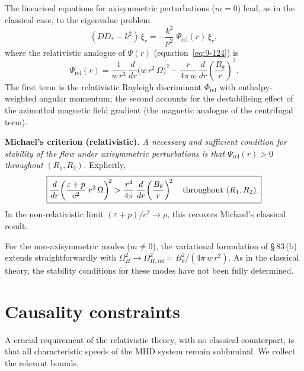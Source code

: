 The linearised equations for axisymmetric perturbations ($m=0$) lead,
as in the classical case, to the eigenvalue problem
\begin{equation}
  (DD_{*} - k^{2})\,\xi_{r}
  = -\frac{k^{2}}{p^{2}}\;
    \Psi_{\mathrm{rel}}(r)\,\xi_{r},
  \label{eq:rel-9-126}
\end{equation}
where the relativistic analogue of $\Psi(r)$
(equation~\eqref{eq:9-124}) is
\begin{equation}
  \Psi_{\mathrm{rel}}(r)
  = \frac{1}{w\,r^{3}}\,\frac{d}{dr}\bigl(w\,r^{2}\,\Omega\bigr)^{2}
    - \frac{r}{4\pi\,w}\,\frac{d}{dr}\!\left(\frac{B_{\theta}}{r}\right)^{\!2}.
  \label{eq:rel-9-Psi}
\end{equation}
The first term is the relativistic Rayleigh discriminant
$\Phi_{\mathrm{rel}}$ with enthalpy-weighted angular momentum; the
second accounts for the destabilising effect of the azimuthal magnetic
field gradient (the magnetic analogue of the centrifugal term).

\medskip\noindent\textbf{Michael's criterion (relativistic).}
\emph{A necessary and sufficient condition for stability of the flow
under axisymmetric perturbations is that
$\Psi_{\mathrm{rel}}(r) > 0$ throughout $(R_{1},R_{2})$.}  Explicitly,
\begin{equation}
  \boxed{%
  \frac{d}{dr}\!\left(\frac{\varepsilon+p}{c^{2}}\;
    r^{2}\,\Omega\right)^{\!2}
  > \frac{r^{4}}{4\pi}\,
    \frac{d}{dr}\!\left(\frac{B_{\theta}}{r}\right)^{\!2}
  \quad\text{throughout } (R_{1},R_{2}).}
  \label{eq:rel-9-Michael}
\end{equation}
In the non-relativistic limit $(\varepsilon+p)/c^{2}\to\rho$, this
recovers Michael's classical result.

For the non-axisymmetric modes ($m\ne 0$), the variational
formulation of \S\,83\,(b) extends straightforwardly with
$\Omega_{H}^{2}\to\Omega_{H,\mathrm{rel}}^{2}
= B_{\theta}^{2}/(4\pi\,w\,r^{2})$.  As in the classical theory, the
stability conditions for these modes have not been fully determined.

\section{Causality constraints}
\label{sec:rel-9-causality}

A crucial requirement of the relativistic theory, with no classical
counterpart, is that all characteristic speeds of the MHD system remain
subluminal.  We collect the relevant bounds.

